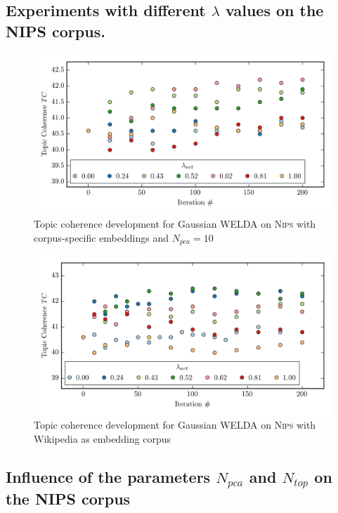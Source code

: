 \documentclass[
        a4paper,
        titlepage,
        twoside,
        parskip,
        numbers=noenddot
        ]{scrbook}
\theoremstyle{break}
\begin{document}
\begin{appendices}
  \subsection{Experiments with different $\lambda$ values on the N{\footnotesize IPS} corpus.}
  \label{sec:appendix_nips_lambda}
  \begin{figure}[H]
         \centering
         \includegraphics[width=\textwidth]{figures/welda_gaussian_nips_50.png}
         \caption{Topic coherence development for Gaussian WELDA on \textsc{Nips} with corpus-specific embeddings and $N_{pca} = 10$}
         \label{fig:welda_gaussian_nips_50}
  \end{figure}
  \begin{figure}[H]
         \centering
         \includegraphics[width=\textwidth]{figures/welda_gaussian_nips_200.png}
         \caption{Topic coherence development for Gaussian WELDA on \textsc{Nips} with Wikipedia as embedding corpus}
         \label{fig:welda_gaussian_nips_200}
  \end{figure}

  \subsection{Influence of the parameters $N_{pca}$ and $N_{top}$ on the N{\footnotesize IPS} corpus}
  \label{sec:appendix_welda_gaussian_nips_pca_samples}


\end{appendices}
\end{document}
